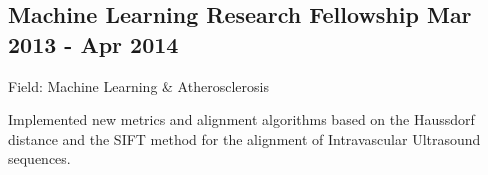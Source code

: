 \documentclass[a4paper,12pt]{article}
\begin{document}

\subsection{Machine Learning Research Fellowship \hfill Mar 2013 - Apr 2014}
\vspace*{1pt}
Field: Machine Learning \& Atherosclerosis
\vspace*{\spaceAfterField}
\begin{zitemize}
\item Implemented new metrics and alignment algorithms based on the Haussdorf distance and the SIFT method for the alignment of Intravascular Ultrasound sequences.
\end{zitemize}
\end{document}

